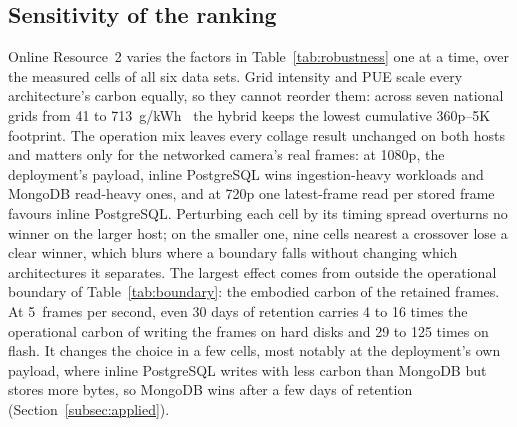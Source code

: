 \documentclass[pdflatex,sn-basic]{sn-jnl}%
\begin{document}
\subsection{Sensitivity of the ranking}\label{subsec:grid}
Online Resource~2 varies the factors in Table~\ref{tab:robustness} one at a time, over the measured cells of all six data sets. Grid intensity and PUE scale every architecture's carbon equally, so they cannot reorder them: across seven national grids from 41 to 713~g/kWh~\citep{owid_carbon_intensity} the hybrid keeps the lowest cumulative 360p--5K footprint. The operation mix leaves every collage result unchanged on both hosts and matters only for the networked camera's real frames: at 1080p, the deployment's payload, inline PostgreSQL wins ingestion-heavy workloads and MongoDB read-heavy ones, and at 720p one latest-frame read per stored frame favours inline PostgreSQL. Perturbing each cell by its timing spread overturns no winner on the larger host; on the smaller one, nine cells nearest a crossover lose a clear winner, which blurs where a boundary falls without changing which architectures it separates. The largest effect comes from outside the operational boundary of Table~\ref{tab:boundary}: the embodied carbon of the retained frames. At 5~frames per second, even 30 days of retention carries 4 to 16 times the operational carbon of writing the frames on hard disks and 29 to 125 times on flash. It changes the choice in a few cells, most notably at the deployment's own payload, where inline PostgreSQL writes with less carbon than MongoDB but stores more bytes, so MongoDB wins after a few days of retention (Section~\ref{subsec:applied}).
\end{document}

